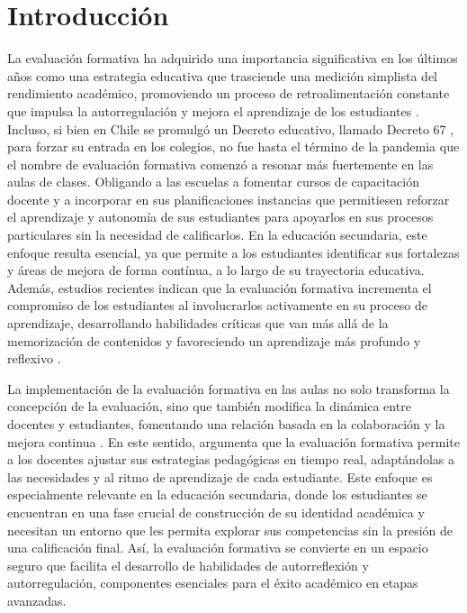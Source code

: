 \documentclass[spanish]{textolivre}
\begin{document}
\begin{polyabstract}
\begin{english}
\begin{abstract}
\end{abstract}
\end{english}
\end{polyabstract}

\section{Introducción}
La evaluación formativa ha adquirido una importancia significativa en los últimos años como una estrategia educativa que trasciende una medición simplista del rendimiento académico, promoviendo un proceso de retroalimentación constante que impulsa la autorregulación y mejora el aprendizaje de los estudiantes \cite{gallardo-fuentes2020}. Incluso, si bien en Chile se promulgó un Decreto educativo, llamado Decreto 67 \cite{bcn2018decreto67}, para forzar su entrada en los colegios, no fue hasta el término de la pandemia que el nombre de evaluación formativa comenzó a resonar más fuertemente en las aulas de clases. Obligando a las escuelas a fomentar cursos de capacitación docente y a incorporar en sus planificaciones instancias que permitiesen reforzar el aprendizaje y autonomía de sus estudiantes para apoyarlos en sus procesos particulares sin la necesidad de calificarlos. En la educación secundaria, este enfoque resulta esencial, ya que permite a los estudiantes identificar sus fortalezas y áreas de mejora de forma contínua, a lo largo de su trayectoria educativa. Además, estudios recientes indican que la evaluación formativa incrementa el compromiso de los estudiantes al involucrarlos activamente en su proceso de aprendizaje, desarrollando habilidades críticas que van más allá de la memorización de contenidos y favoreciendo un aprendizaje más profundo y reflexivo \cite{bizarro2019}.

La implementación de la evaluación formativa en las aulas no solo transforma la concepción de la evaluación, sino que también modifica la dinámica entre docentes y estudiantes, fomentando una relación basada en la colaboración y la mejora continua \cite{hidalgo2021}. En este sentido, \textcite{copado2022} argumenta que la evaluación formativa permite a los docentes ajustar sus estrategias pedagógicas en tiempo real, adaptándolas a las necesidades y al ritmo de aprendizaje de cada estudiante. Este enfoque es especialmente relevante en la educación secundaria, donde los estudiantes se encuentran en una fase crucial de construcción de su identidad académica y necesitan un entorno que les permita explorar sus competencias sin la presión de una calificación final. Así, la evaluación formativa se convierte en un espacio seguro que facilita el desarrollo de habilidades de autorreflexión y autorregulación, componentes esenciales para el éxito académico en etapas avanzadas.
\end{document}
